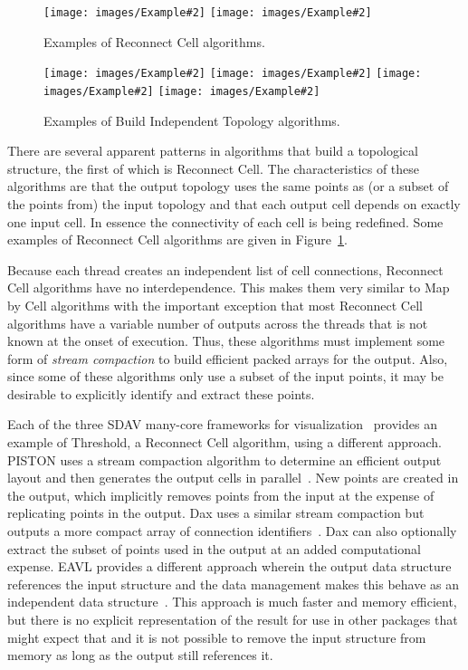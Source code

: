 \documentclass{sig-alternate}
\newcommand*{\lcite}[1]{~\cite{#1}}
\newcommand*{\keyterm}[1]{\emph{#1}}
\newcommand{\algclass}[1]{\textsf{#1}}
\newcommand{\alg}[1]{#1}
\newcommand{\exampleimage}[2][.24]{\texttt{[image: images/Example\#2]}}
\begin{document}
\begin{figure}
  \centering
  \exampleimage[.43]{Extract}
  \exampleimage[.43]{Threshold}
  \caption{Examples of \algclass{Reconnect Cell} algorithms.}
  \label{fig:ReconnectCell}
\end{figure}

\begin{figure}
  \centering
  \exampleimage{Glyph}
  \exampleimage{Ribbon}
  \exampleimage{Shrink}
  \exampleimage{Tube}
  \caption{Examples of \algclass{Build Independent Topology} algorithms.}
  \label{fig:BuildIndependentTopology}
\end{figure}

\noindent
There are several apparent patterns in algorithms that build a topological
structure, the first of which is \algclass{Reconnect Cell}. The
characteristics of these algorithms are that the output topology uses the
same points as (or a subset of the points from) the input topology and that
each output cell depends on exactly one input cell. In essence the
connectivity of each cell is being redefined. Some examples of
\algclass{Reconnect Cell} algorithms are given in
Figure~\ref{fig:ReconnectCell}.

Because each thread creates an independent list of cell connections,
\algclass{Reconnect Cell} algorithms have no interdependence. This makes
them very similar to \algclass{Map by Cell} algorithms with the important
exception that most \algclass{Reconnect Cell} algorithms have a variable
number of outputs across the threads that is not known at the onset of
execution. Thus, these algorithms must implement some form of
\keyterm{stream compaction} to build efficient packed arrays for the
output. Also, since some of these algorithms only use a subset of the input
points, it may be desirable to explicitly identify and extract these
points.

Each of the three SDAV many-core frameworks for
visualization\lcite{Sewell2012} provides an example of \alg{Threshold}, a
\algclass{Reconnect Cell} algorithm, using a different approach. PISTON
uses a stream compaction algorithm to determine an efficient output layout
and then generates the output cells in parallel\lcite{PISTON}. New points
are created in the output, which implicitly removes points from the input
at the expense of replicating points in the output. Dax uses a similar
stream compaction but outputs a more compact array of connection
identifiers\lcite{Maynard2013}. Dax can also optionally extract the subset
of points used in the output at an added computational expense. EAVL
provides a different approach wherein the output data structure references
the input structure and the data management makes this behave as an
independent data structure\lcite{Meredith2012}. This approach is much
faster and memory efficient, but there is no explicit representation of the
result for use in other packages that might expect that and it is not
possible to remove the input structure from memory as long as the output
still references it.
\end{document}

